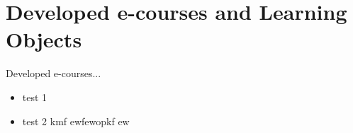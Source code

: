 \chapter{Developed e-courses and Learning Objects}
\label{Developed e-courses and Learning Objects}
Developed e-courses...
\begin{itemize}
	\item test 1
	\item test 2 kmf ewfewopkf ew
\end{itemize}

